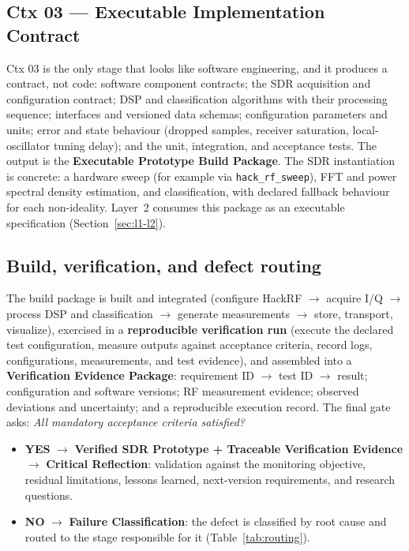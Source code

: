 \documentclass[11pt,a4paper]{article}
\begin{document}
\subsection{Ctx 03 --- Executable Implementation Contract}
\label{sec:ctx03}

Ctx 03 is the only stage that looks like software engineering, and it produces a contract, not
code: software component contracts; the SDR acquisition and configuration contract; DSP and
classification algorithms with their processing sequence; interfaces and versioned data schemas;
configuration parameters and units; error and state behaviour (dropped samples, receiver
saturation, local-oscillator tuning delay); and the unit, integration, and acceptance tests. The
output is the \textbf{Executable Prototype Build Package}. The SDR instantiation is concrete: a
hardware sweep (for example via \texttt{hack\_rf\_sweep}), FFT and power spectral density
estimation, and classification, with declared fallback behaviour for each non-ideality. Layer~2
consumes this package as an executable specification (Section~\ref{sec:l1-l2}).

\subsection{Build, verification, and defect routing}
\label{sec:routing}

The build package is built and integrated (configure HackRF $\rightarrow$ acquire I/Q $\rightarrow$
process DSP and classification $\rightarrow$ generate measurements $\rightarrow$ store, transport,
visualize), exercised in a \textbf{reproducible verification run} (execute the declared test
configuration, measure outputs against acceptance criteria, record logs, configurations,
measurements, and test evidence), and assembled into a \textbf{Verification Evidence Package}:
requirement ID $\rightarrow$ test ID $\rightarrow$ result; configuration and software versions;
RF measurement evidence; observed deviations and uncertainty; and a reproducible execution
record. The final gate asks: \emph{All mandatory acceptance criteria satisfied?}

\begin{itemize}
  \item \textbf{YES} $\rightarrow$ \textbf{Verified SDR Prototype + Traceable Verification
    Evidence} $\rightarrow$ \textbf{Critical Reflection}: validation against the monitoring
    objective, residual limitations, lessons learned, next-version requirements, and research
    questions.
  \item \textbf{NO} $\rightarrow$ \textbf{Failure Classification}: the defect is classified by
    root cause and routed to the stage responsible for it (Table~\ref{tab:routing}).
\end{itemize}
\end{document}
